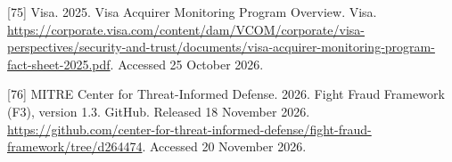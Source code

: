 \documentclass[
  11pt,
]{article}
\newlength{\cslhangindent}
\newlength{\cslentryspacingunit} %
\newenvironment{CSLReferences}[2] %
 {%
  \setlength{\parindent}{0pt}
  \ifodd #1
  \let\oldpar\par
  \def\par{\hangindent=\cslhangindent\oldpar}
  \fi
  \setlength{\parskip}{#2\cslentryspacingunit}
 }%
 {}
\begin{document}
\begin{CSLReferences}{1}{1}
\leavevmode{}%
{[}75{]} Visa. 2025. Visa Acquirer Monitoring Program Overview. Visa.
\url{https://corporate.visa.com/content/dam/VCOM/corporate/visa-perspectives/security-and-trust/documents/visa-acquirer-monitoring-program-fact-sheet-2025.pdf}.
Accessed 25 October 2026.

\leavevmode{}%
{[}76{]} MITRE Center for Threat-Informed Defense. 2026. Fight Fraud
Framework (F3), version 1.3. GitHub. Released 18 November 2026.
\url{https://github.com/center-for-threat-informed-defense/fight-fraud-framework/tree/d264474}.
Accessed 20 November 2026.

\end{CSLReferences}
\end{document}
